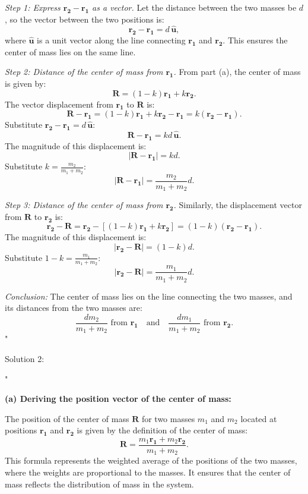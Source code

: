 \textit{Step 1: Express $\mathbf{r_2} - \mathbf{r_1}$ as a vector.}  
Let the distance between the two masses be $d$, so the vector between the two positions is:
\[
\mathbf{r_2} - \mathbf{r_1} = d \, \hat{\mathbf{u}},
\]
where $\hat{\mathbf{u}}$ is a unit vector along the line connecting $\mathbf{r_1}$ and $\mathbf{r_2}$. This ensures the center of mass lies on the same line.

\textit{Step 2: Distance of the center of mass from $\mathbf{r_1}$.}  
From part (a), the center of mass is given by:
\[
\mathbf{R} = (1 - k)\mathbf{r_1} + k\mathbf{r_2}.
\]
The vector displacement from $\mathbf{r_1}$ to $\mathbf{R}$ is:
\[
\mathbf{R} - \mathbf{r_1} = (1 - k)\mathbf{r_1} + k\mathbf{r_2} - \mathbf{r_1} = k(\mathbf{r_2} - \mathbf{r_1}).
\]
Substitute $\mathbf{r_2} - \mathbf{r_1} = d \, \hat{\mathbf{u}}$:
\[
\mathbf{R} - \mathbf{r_1} = k d \, \hat{\mathbf{u}}.
\]
The magnitude of this displacement is:
\[
|\mathbf{R} - \mathbf{r_1}| = k d.
\]
Substitute $k = \frac{m_2}{m_1 + m_2}$:
\[
|\mathbf{R} - \mathbf{r_1}| = \frac{m_2}{m_1 + m_2} d.
\]

\textit{Step 3: Distance of the center of mass from $\mathbf{r_2}$.}  
Similarly, the displacement vector from $\mathbf{R}$ to $\mathbf{r_2}$ is:
\[
\mathbf{r_2} - \mathbf{R} = \mathbf{r_2} - \left[(1 - k)\mathbf{r_1} + k\mathbf{r_2}\right] = (1 - k)(\mathbf{r_2} - \mathbf{r_1}).
\]
The magnitude of this displacement is:
\[
|\mathbf{r_2} - \mathbf{R}| = (1 - k)d.
\]
Substitute $1 - k = \frac{m_1}{m_1 + m_2}$:
\[
|\mathbf{r_2} - \mathbf{R}| = \frac{m_1}{m_1 + m_2} d.
\]

\textit{Conclusion:}  
The center of mass lies on the line connecting the two masses, and its distances from the two masses are:
\[
\frac{d m_2}{m_1 + m_2} \text{ from } \mathbf{r_1} \quad \text{and} \quad \frac{d m_1}{m_1 + m_2} \text{ from } \mathbf{r_2}.
\]"

Solution 2:

"

\textbf{(a) Deriving the position vector of the center of mass:}

The position of the center of mass $\mathbf{R}$ for two masses $m_1$ and $m_2$ located at positions $\mathbf{r_1}$ and $\mathbf{r_2}$ is given by the definition of the center of mass:
\[
\mathbf{R} = \frac{m_1\mathbf{r_1} + m_2\mathbf{r_2}}{m_1 + m_2}.
\]
This formula represents the weighted average of the positions of the two masses, where the weights are proportional to the masses. It ensures that the center of mass reflects the distribution of mass in the system.

